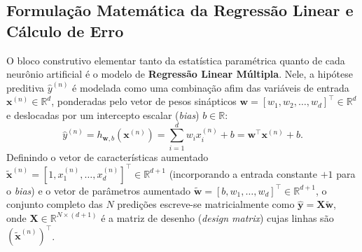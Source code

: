 \documentclass[runningheads]{llncs}
\begin{document}
\subsection{Formula\c{c}\~{a}o Matem\'{a}tica da Regress\~{a}o Linear e C\'{a}lculo de Erro}
O bloco construtivo elementar tanto da estat\'{i}stica param\'{e}trica quanto de cada neur\^{o}nio artificial \'{e} o modelo de \textbf{Regress\~{a}o Linear M\'{u}ltipla}. Nele, a hip\'{o}tese preditiva $\hat{y}^{(n)}$ \'{e} modelada como uma combina\c{c}\~{a}o afim das vari\'{a}veis de entrada $\mathbf{x}^{(n)} \in \mathbb{R}^d$, ponderadas pelo vetor de pesos sin\'{a}pticos $\mathbf{w} = [w_1, w_2, \dots, w_d]^\top \in \mathbb{R}^d$ e deslocadas por um intercepto escalar (\textit{bias}) $b \in \mathbb{R}$:
\begin{equation}
    \hat{y}^{(n)} = h_{\mathbf{w}, b}(\mathbf{x}^{(n)}) = \sum_{i=1}^{d} w_i x_i^{(n)} + b = \mathbf{w}^\top \mathbf{x}^{(n)} + b.
    \label{eq:linear_reg}
\end{equation}
Definindo o vetor de caracter\'{i}sticas aumentado $\tilde{\mathbf{x}}^{(n)} = [1, x_1^{(n)}, \dots, x_d^{(n)}]^\top \in \mathbb{R}^{d+1}$ (incorporando a entrada constante $+1$ para o \textit{bias}) e o vetor de par\^{a}metros aumentado $\tilde{\mathbf{w}} = [b, w_1, \dots, w_d]^\top \in \mathbb{R}^{d+1}$, o conjunto completo das $N$ predi\c{c}\~{o}es escreve-se matricialmente como $\hat{\mathbf{y}} = \mathbf{X}\tilde{\mathbf{w}}$, onde $\mathbf{X} \in \mathbb{R}^{N \times (d+1)}$ \'{e} a matriz de desenho (\textit{design matrix}) cujas linhas s\~{a}o $(\tilde{\mathbf{x}}^{(n)})^\top$.
\end{document}
